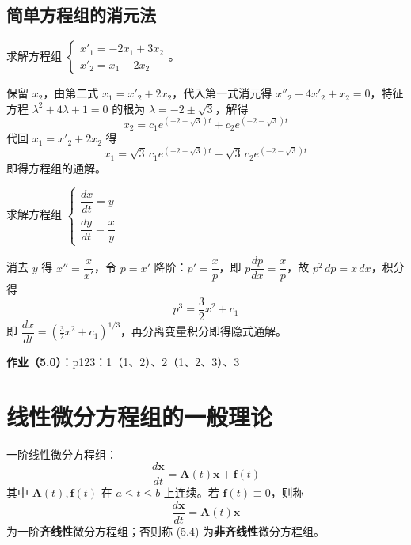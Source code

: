 \subsection{简单方程组的消元法}

\begin{example}
求解方程组 $\begin{cases} x'_1 = -2x_1 + 3x_2 \\ x'_2 = x_1 - 2x_2 \end{cases}$。
\end{example}

\begin{solution}
保留 $x_2$，由第二式 $x_1 = x'_2 + 2x_2$，代入第一式消元得 $x''_2 + 4x'_2 + x_2 = 0$，特征方程 $\lambda^2 + 4\lambda + 1 = 0$ 的根为 $\lambda = -2 \pm \sqrt{3}$，解得
$$x_2 = c_1e^{(-2+\sqrt{3})t} + c_2e^{(-2-\sqrt{3})t}$$
代回 $x_1 = x'_2 + 2x_2$ 得
$$x_1 = \sqrt{3}\,c_1e^{(-2+\sqrt{3})t} - \sqrt{3}\,c_2e^{(-2-\sqrt{3})t}$$
即得方程组的通解。
\end{solution}

\begin{example}
求解方程组 $\begin{cases} \dfrac{dx}{dt} = y \\ \dfrac{dy}{dt} = \dfrac{x}{y} \end{cases}$
\end{example}

\begin{solution}
消去 $y$ 得 $x'' = \dfrac{x}{x'}$，令 $p = x'$ 降阶：$p' = \dfrac{x}{p}$，即 $p\dfrac{dp}{dx} = \dfrac{x}{p}$，故 $p^2\,dp = x\,dx$，积分得
$$p^3 = \frac{3}{2}x^2 + c_1$$
即 $\dfrac{dx}{dt} = \left(\frac{3}{2}x^2 + c_1\right)^{1/3}$，再分离变量积分即得隐式通解。
\end{solution}

\textbf{作业（5.0）}：p123：1（1、2）、2（1、2、3）、3

\section{线性微分方程组的一般理论}

一阶线性微分方程组：
\begin{equation}\frac{d\mathbf{x}}{dt} = \mathbf{A}(t)\mathbf{x} + \mathbf{f}(t) \tag{5.4}\end{equation}
其中 $\mathbf{A}(t), \mathbf{f}(t)$ 在 $a \le t \le b$ 上连续。若 $\mathbf{f}(t) \equiv 0$，则称
\begin{equation}\frac{d\mathbf{x}}{dt} = \mathbf{A}(t)\mathbf{x} \tag{5.8}\end{equation}
为一阶\textbf{齐线性}微分方程组；否则称 (5.4) 为\textbf{非齐线性}微分方程组。

